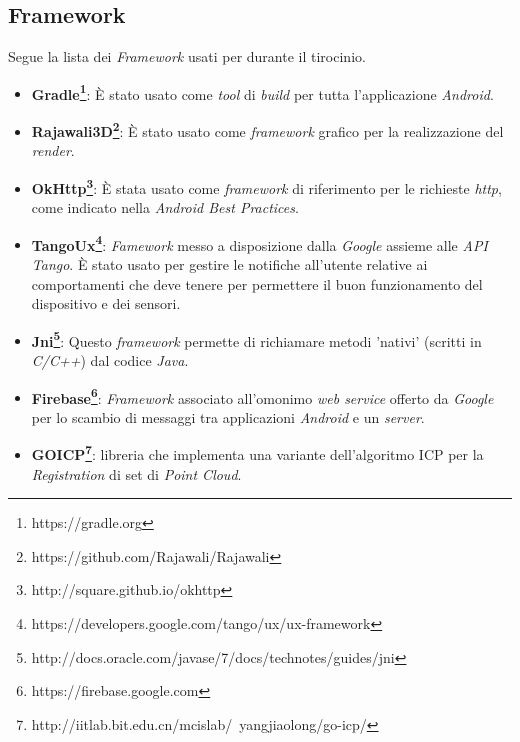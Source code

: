 \subsection{Framework}
Segue la lista dei \emph{Framework} usati per durante il tirocinio.
\begin{itemize}
	\item \textbf{Gradle\footnote{https://gradle.org}}: È stato usato come \emph{tool} di \emph{build} per tutta l'applicazione \emph{Android}.
	\item \textbf{Rajawali3D\footnote{https://github.com/Rajawali/Rajawali}}: È stato usato come \emph{framework} grafico per la realizzazione del \emph{render}.
	\item \textbf{OkHttp\footnote{http://square.github.io/okhttp}}: È stata usato come \emph{framework} di riferimento per le richieste \emph{http}, come indicato nella \emph{Android Best Practices}.
	\item \textbf{TangoUx\footnote{https://developers.google.com/tango/ux/ux-framework}}: \emph{Famework} messo a disposizione dalla \emph{Google} assieme alle \emph{API Tango}. È stato usato per gestire le notifiche all'utente relative ai comportamenti che deve tenere per permettere il buon funzionamento del dispositivo e dei sensori.
	\item \textbf{Jni\footnote{http://docs.oracle.com/javase/7/docs/technotes/guides/jni}}: Questo \emph{framework} permette di richiamare metodi 'nativi' (scritti in \emph{C/C++}) dal codice \emph{Java}.
	\item \textbf{Firebase\footnote{https://firebase.google.com}}: \emph{Framework} associato all'omonimo \emph{web service} offerto da \emph{Google} per lo scambio di messaggi tra applicazioni \emph{Android} e un \emph{server}.
	\item \textbf{GOICP\footnote{http://iitlab.bit.edu.cn/mcislab/~yangjiaolong/go-icp/}}: libreria che implementa una variante dell'algoritmo ICP per la \emph{Registration} di set di \emph{Point Cloud}.
\end{itemize}